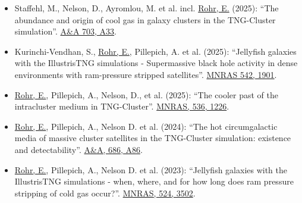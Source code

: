 \documentclass[a4paper,12pt,oneside]{article}
\begin{document}
\begin{itemize}[wide, labelwidth=!, labelindent=-11pt, parsep=0pt, noitemsep]
    \item Staffehl, M., Nelson, D., Ayromlou, M. et al. incl. \underline{Rohr, E.} (2025): ``The abundance and origin of cool gas in galaxy clusters in the TNG-Cluster simulation''. \href{https://ui.adsabs.harvard.edu/abs/2025A\%26A...703A..33S/abstract}{A\&A 703, A33}.
    \item Kurinchi-Vendhan, S., \underline{Rohr, E.}, Pillepich, A. et al. (2025): ``Jellyfish galaxies with the IllustrisTNG simulations - Supermassive black hole activity in dense environments with ram-pressure stripped satellites''. \href{https://ui.adsabs.harvard.edu/abs/2025MNRAS.542.1901K/abstract}{MNRAS 542, 1901}.
    \item \underline{Rohr, E.}, Pillepich, A., Nelson, D., et al. (2025): ``The cooler past of the intracluster medium in TNG-Cluster''. \href{https://ui.adsabs.harvard.edu/abs/2025MNRAS.536.1226R/abstract}{MNRAS, 536, 1226}.
    \item \underline{Rohr, E.}, Pillepich, A., Nelson D. et al. (2024): ``The hot circumgalactic media of massive cluster satellites in the TNG-Cluster simulation: existence and detectability''. \href{https://ui.adsabs.harvard.edu/abs/2024A\%26A...686A..86R/abstract}{A\&A, 686, A86}.
    \item \underline{Rohr, E.}, Pillepich, A., Nelson D. et al. (2023): ``Jellyfish galaxies with the IllustrisTNG simulations - when, where, and for how long does ram pressure stripping of cold gas occur?''. \href{https://ui.adsabs.harvard.edu/abs/2023MNRAS.524.3502R/abstract}{MNRAS, 524, 3502}.
\end{itemize}
\end{document}
